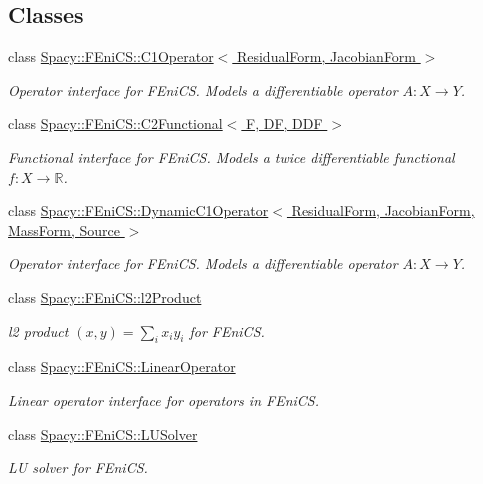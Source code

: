 \subsection*{Classes}
\begin{DoxyCompactItemize}
\item 
class \hyperlink{classSpacy_1_1FEniCS_1_1C1Operator}{Spacy\+::\+F\+Eni\+C\+S\+::\+C1\+Operator$<$ Residual\+Form, Jacobian\+Form $>$}
\begin{DoxyCompactList}\small\item\em Operator interface for F\+Eni\+C\+S. Models a differentiable operator $A:X\rightarrow Y$. \end{DoxyCompactList}\item 
class \hyperlink{classSpacy_1_1FEniCS_1_1C2Functional}{Spacy\+::\+F\+Eni\+C\+S\+::\+C2\+Functional$<$ F, D\+F, D\+D\+F $>$}
\begin{DoxyCompactList}\small\item\em Functional interface for F\+Eni\+C\+S. Models a twice differentiable functional $f:X\rightarrow \mathbb{R}$. \end{DoxyCompactList}\item 
class \hyperlink{classSpacy_1_1FEniCS_1_1DynamicC1Operator}{Spacy\+::\+F\+Eni\+C\+S\+::\+Dynamic\+C1\+Operator$<$ Residual\+Form, Jacobian\+Form, Mass\+Form, Source $>$}
\begin{DoxyCompactList}\small\item\em Operator interface for F\+Eni\+C\+S. Models a differentiable operator $A:X\rightarrow Y$. \end{DoxyCompactList}\item 
class \hyperlink{classSpacy_1_1FEniCS_1_1l2Product}{Spacy\+::\+F\+Eni\+C\+S\+::l2\+Product}
\begin{DoxyCompactList}\small\item\em l2 product $(x,y) = \sum_i x_i y_i $ for F\+Eni\+C\+S. \end{DoxyCompactList}\item 
class \hyperlink{classSpacy_1_1FEniCS_1_1LinearOperator}{Spacy\+::\+F\+Eni\+C\+S\+::\+Linear\+Operator}
\begin{DoxyCompactList}\small\item\em Linear operator interface for operators in F\+Eni\+C\+S. \end{DoxyCompactList}\item 
class \hyperlink{classSpacy_1_1FEniCS_1_1LUSolver}{Spacy\+::\+F\+Eni\+C\+S\+::\+L\+U\+Solver}
\begin{DoxyCompactList}\small\item\em L\+U solver for F\+Eni\+C\+S. \end{DoxyCompactList}\item 

\end{DoxyCompactItemize}

